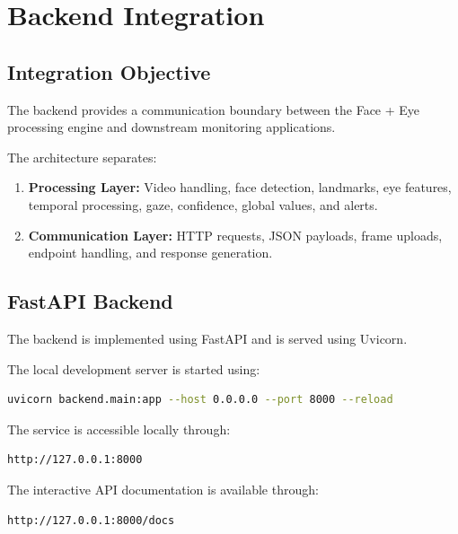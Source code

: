 \documentclass{tietreport}
\begin{document}

\chapter{Backend Integration}

\section{Integration Objective}

The backend provides a communication boundary between the Face + Eye
processing engine and downstream monitoring applications.

The architecture separates:

\begin{enumerate}
    \item \textbf{Processing Layer:} Video handling, face detection,
    landmarks, eye features, temporal processing, gaze, confidence,
    global values, and alerts.

    \item \textbf{Communication Layer:} HTTP requests, JSON payloads,
    frame uploads, endpoint handling, and response generation.
\end{enumerate}


\section{FastAPI Backend}

The backend is implemented using FastAPI and is served using Uvicorn.

The local development server is started using:

\begin{lstlisting}[language=bash]
uvicorn backend.main:app --host 0.0.0.0 --port 8000 --reload
\end{lstlisting}

The service is accessible locally through:

\begin{lstlisting}
http://127.0.0.1:8000
\end{lstlisting}

The interactive API documentation is available through:

\begin{lstlisting}
http://127.0.0.1:8000/docs
\end{lstlisting}
\end{document}
